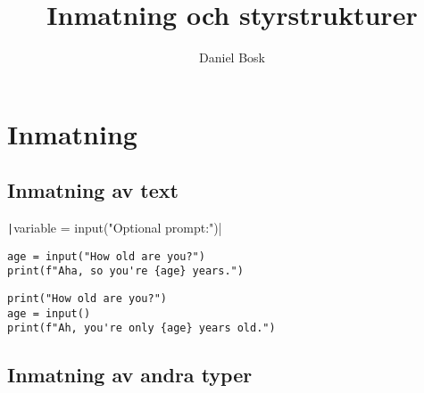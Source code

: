 \title{%
  Inmatning och styrstrukturer
}
\author{Daniel Bosk}


\mode*

\begin{abstract}
  
\end{abstract}


\section{Inmatning}

\subsection{Inmatning av text}

\begin{frame}
  \begin{center}
    \texttt|variable = input("Optional prompt:")|
  \end{center}
\end{frame}

\begin{frame}[fragile]
  \begin{example}
    \begin{verbatim}
age = input("How old are you?")
print(f"Aha, so you're {age} years.")
    \end{verbatim}
  \end{example}

  \pause

  \begin{example}
    \begin{verbatim}
print("How old are you?")
age = input()
print(f"Ah, you're only {age} years old.")
    \end{verbatim}
  \end{example}
\end{frame}

\subsection{Inmatning av andra typer}

